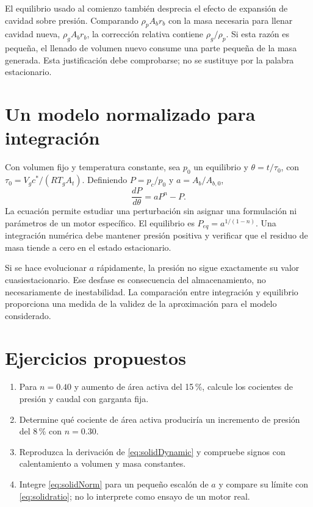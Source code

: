 El equilibrio usado al comienzo también desprecia el efecto de expansión de cavidad sobre presión. Comparando $\rho_pA_br_b$ con la masa necesaria para llenar cavidad nueva, $\rho_gA_br_b$, la corrección relativa contiene $\rho_g/\rho_p$. Si esta razón es pequeña, el llenado de volumen nuevo consume una parte pequeña de la masa generada. Esta justificación debe comprobarse; no se sustituye por la palabra estacionario.
\section{Un modelo normalizado para integración}
Con volumen fijo y temperatura constante, sea $p_0$ un equilibrio y $\theta=t/\tau_0$, con $\tau_0=V_gc^*/(RT_gA_t)$. Definiendo $P=p_c/p_0$ y $a=A_b/A_{b,0}$,
\begin{equation}\label{eq:solidNorm}
 \frac{dP}{d\theta}=aP^n-P.
\end{equation}
La ecuación permite estudiar una perturbación sin asignar una formulación ni parámetros de un motor específico. El equilibrio es $P_{eq}=a^{1/(1-n)}$. Una integración numérica debe mantener presión positiva y verificar que el residuo de masa tiende a cero en el estado estacionario.

Si se hace evolucionar $a$ rápidamente, la presión no sigue exactamente su valor cuasiestacionario. Ese desfase es consecuencia del almacenamiento, no necesariamente de inestabilidad. La comparación entre integración y equilibrio proporciona una medida de la validez de la aproximación para el modelo considerado.
\section{Ejercicios propuestos}
\begin{enumerate}
\item Para $n=0.40$ y aumento de área activa del 15\,\%, calcule los cocientes de presión y caudal con garganta fija.
\item Determine qué cociente de área activa produciría un incremento de presión del 8\,\% con $n=0.30$.
\item Reproduzca la derivación de \eqref{eq:solidDynamic} y compruebe signos con calentamiento a volumen y masa constantes.
\item Integre \eqref{eq:solidNorm} para un pequeño escalón de $a$ y compare su límite con \eqref{eq:solidratio}; no lo interprete como ensayo de un motor real.
\end{enumerate}
